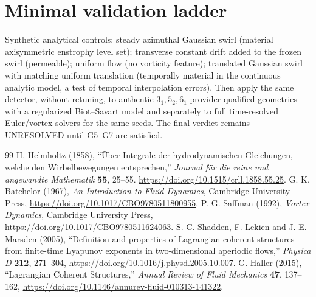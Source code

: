 \documentclass[11pt,a4paper]{article}
\begin{document}
\section{Minimal validation ladder}
Synthetic analytical controls: steady azimuthal Gaussian swirl (material axisymmetric enstrophy level set); transverse constant drift added to the frozen swirl (permeable); uniform flow (no vorticity feature); translated Gaussian swirl with matching uniform translation (temporally material in the continuous analytic model, a test of temporal interpolation errors). Then apply the same detector, without retuning, to authentic $3_1,5_2,6_1$ provider-qualified geometries with a regularized Biot--Savart model and separately to full time-resolved Euler/vortex-solvers for the same seeds. The final verdict remains UNRESOLVED until G5--G7 are satisfied.

\begin{thebibliography}{99}
 H. Helmholtz (1858), ``\"Uber Integrale der hydrodynamischen Gleichungen, welche den Wirbelbewegungen entsprechen,'' \emph{Journal f\"ur die reine und angewandte Mathematik} \textbf{55}, 25--55. \url{https://doi.org/10.1515/crll.1858.55.25}.
 G. K. Batchelor (1967), \emph{An Introduction to Fluid Dynamics}, Cambridge University Press, \url{https://doi.org/10.1017/CBO9780511800955}.
 P. G. Saffman (1992), \emph{Vortex Dynamics}, Cambridge University Press, \url{https://doi.org/10.1017/CBO9780511624063}.
 S. C. Shadden, F. Lekien and J. E. Marsden (2005), ``Definition and properties of Lagrangian coherent structures from finite-time Lyapunov exponents in two-dimensional aperiodic flows,'' \emph{Physica D} \textbf{212}, 271--304, \url{https://doi.org/10.1016/j.physd.2005.10.007}.
 G. Haller (2015), ``Lagrangian Coherent Structures,'' \emph{Annual Review of Fluid Mechanics} \textbf{47}, 137--162, \url{https://doi.org/10.1146/annurev-fluid-010313-141322}.
\end{thebibliography}
\end{document}
